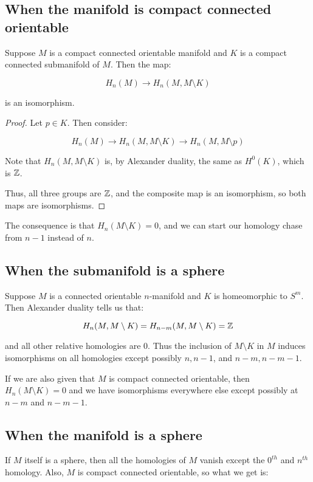 \documentclass[a4paper]{amsart}
\begin{document}
\subsection{When the manifold is compact connected orientable}

\begin{claimer}
  Suppose $M$ is a compact connected orientable manifold and $K$ is a
  compact connected submanifold of $M$. Then the map:

  $$H_n(M) \to H_n(M, M \setminus K)$$

  is an isomorphism.
\end{claimer}

\begin{proof}
  Let $p \in K$. Then consider:

  $$H_n(M) \to H_n(M, M \setminus K) \to H_n(M, M \setminus p)$$

  Note that $H_n(M, M \setminus K)$ is, by Alexander duality, the same
  as $H^0(K)$, which is $\mathbb{Z}$.

  Thus, all three groups are $\mathbb{Z}$, and the composite map is an
  isomorphism, so both maps are isomorphisms.
\end{proof}

The consequence is that $H_n(M \setminus K) = 0$, and we can start our
homology chase from $n-1$ instead of $n$.

\subsection{When the submanifold is a sphere}

Suppose $M$ is a connected orientable $n$-manifold and $K$ is
homeomorphic to $S^m$. Then Alexander duality tells us that:

$$H_n(M, M \setminus K) = H_{n-m}(M, M \setminus K) = \mathbb{Z}$$

and all other relative homologies are $0$. Thus the inclusion of $M
\setminus K$ in $M$ induces isomorphisms on all homologies except
possibly $n,n-1$, and $n-m,n-m-1$.

If we are also given that $M$ is compact connected orientable, then
$H_n(M \setminus K) = 0$ and we have isomorphisms everywhere else except
possibly at $n-m$ and $n-m-1$.

\subsection{When the manifold is a sphere}

If $M$ itself is a sphere, then all the homologies of $M$ vanish
except the $0^{th}$ and $n^{th}$ homology. Also, $M$ is compact
connected orientable, so what we get is:
\end{document}
